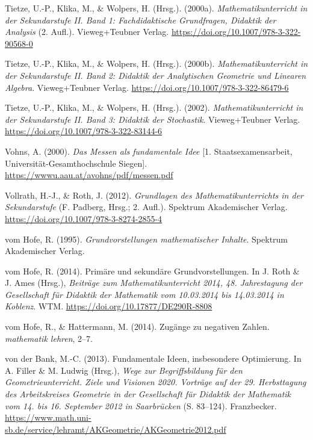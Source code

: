 \documentclass[
]{scrbook}
\newlength{\cslhangindent}
\newenvironment{CSLReferences}[2] %
 {\begin{list}{}{%
  \setlength{\itemindent}{0pt}
  \setlength{\leftmargin}{0pt}
  \setlength{\parsep}{0pt}
  \ifodd #1
   \setlength{\leftmargin}{\cslhangindent}
   \setlength{\itemindent}{-1\cslhangindent}
  \fi
  \setlength{\itemsep}{#2\baselineskip}}}
 {\end{list}}
\theoremstyle{definition}
\theoremstyle{definition}
\theoremstyle{definition}
\theoremstyle{definition}
\theoremstyle{remark}
\begin{document}
\begin{CSLReferences}{1}{0}
Tietze, U.-P., Klika, M., \& Wolpers, H. (Hrsg.). (2000a). \emph{Mathematikunterricht in der {Sekundarstufe} {II}. {Band} 1: {Fachdidaktische} {Grundfragen}, {Didaktik} der {Analysis}} (2. Aufl.). Vieweg+Teubner Verlag. \url{https://doi.org/10.1007/978-3-322-90568-0}

Tietze, U.-P., Klika, M., \& Wolpers, H. (Hrsg.). (2000b). \emph{Mathematikunterricht in der {Sekundarstufe} {II}. {Band} 2: {Didaktik} der {Analytischen} {Geometrie} und {Linearen} {Algebra}}. Vieweg+Teubner Verlag. \url{https://doi.org/10.1007/978-3-322-86479-6}

Tietze, U.-P., Klika, M., \& Wolpers, H. (Hrsg.). (2002). \emph{Mathematikunterricht in der {Sekundarstufe} {II}. {Band} 3: {Didaktik} der {Stochastik}}. Vieweg+Teubner Verlag. \url{https://doi.org/10.1007/978-3-322-83144-6}

Vohns, A. (2000). \emph{Das {Messen} als fundamentale {Idee}} {[}1. Staatsexamensarbeit, Universität-Gesamthochschule Siegen{]}. \url{https://wwwu.aau.at/avohns/pdf/messen.pdf}

Vollrath, H.-J., \& Roth, J. (2012). \emph{Grundlagen des {Mathematikunterrichts} in der {Sekundarstufe}} (F. Padberg, Hrsg.; 2. Aufl.). Spektrum Akademischer Verlag. \url{https://doi.org/10.1007/978-3-8274-2855-4}

vom Hofe, R. (1995). \emph{Grundvorstellungen mathematischer {Inhalte}}. Spektrum Akademischer Verlag.

vom Hofe, R. (2014). Primäre und sekundäre {Grundvorstellungen}. In J. Roth \& J. Ames (Hrsg.), \emph{Beiträge zum {Mathematikunterricht} 2014, 48. {Jahrestagung} der {Gesellschaft} für {Didaktik} der {Mathematik} vom 10.03.2014 bis 14.03.2014 in {Koblenz}}. WTM. \url{https://doi.org/10.17877/DE290R-8808}

vom Hofe, R., \& Hattermann, M. (2014). Zugänge zu negativen {Zahlen}. \emph{mathematik lehren}, 2--7.

von der Bank, M.-C. (2013). Fundamentale {Ideen}, insbesondere {Optimierung}. In A. Filler \& M. Ludwig (Hrsg.), \emph{Wege zur {Begriffsbildung} für den {Geometrieunterricht}. {Ziele} und {Visionen} 2020. {Vorträge} auf der 29. {Herbsttagung} des {Arbeitskreises} {Geometrie} in der {Gesellschaft} für {Didaktik} der {Mathematik} vom 14. bis 16. {September} 2012 in {Saarbrücken}} (S. 83--124). Franzbecker. \url{https://www.math.uni-sb.de/service/lehramt/AKGeometrie/AKGeometrie2012.pdf}


\end{CSLReferences}
\end{document}
